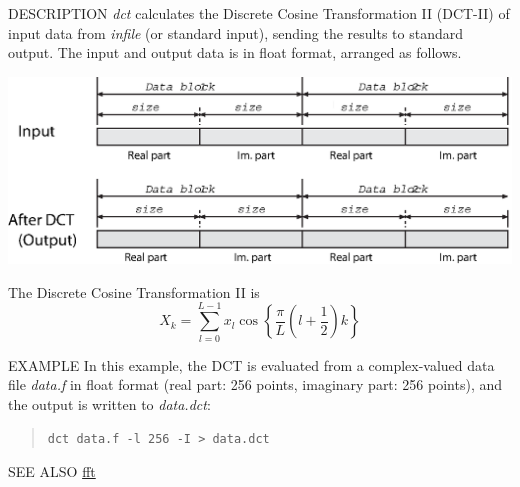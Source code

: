 \begin{synopsis}
\item[dct] [ --l $L$ ] [ --\{ I \} ] [ --\{ d \} ] [ {\em infile} ] 
\end{synopsis}

\begin{qsection}{DESCRIPTION}
{\em dct} calculates the Discrete Cosine Transformation II (DCT-II) 
of input data from {\em infile} (or standard input), 
sending the results to standard output.
The input and output data is in float format, arranged as follows.
\begin{center}
 \leavevmode
 \includegraphics{fig/dct.eps} 
\end{center}
The Discrete Cosine Transformation II is
\begin{displaymath}
 X_{k} = \sum_{l=0}^{L-1}x_{l}\cos\left\{\frac{\pi}{L}\left( l+\frac{1}{2}\right)k\right\}
\end{displaymath}
\par
\end{qsection}

\begin{options}
\end{options}

\begin{qsection}{EXAMPLE}
In this example, the DCT is evaluated from a complex-valued data file
{\em data.f} in float format
(real part: 256 points, imaginary part: 256 points),
and the output is written to {\em data.dct}:
\begin{quote}
  \verb!dct data.f -l 256 -I > data.dct!
\end{quote}
\end{qsection}

\begin{qsection}{SEE ALSO}
\hyperlink{fft}{fft}
\end{qsection}
